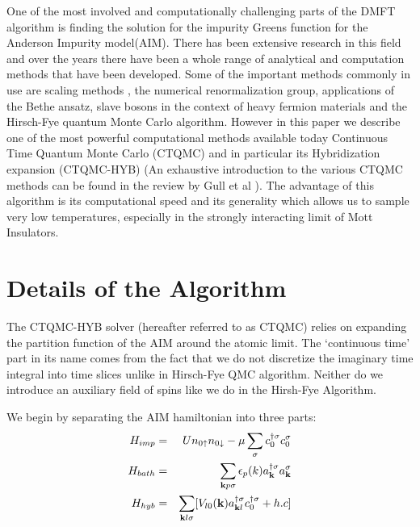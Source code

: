 \documentclass[10pt]{ruthesis}
\begin{document}
One of the most involved and computationally challenging parts of the DMFT algorithm is finding the solution for the impurity Greens function for the Anderson Impurity model(AIM). There has been extensive research in this field and over the years there have been a whole range of analytical and computation methods that have been developed. Some of the important  methods commonly in use are scaling methods \cite{AndersonKondo}, the numerical renormalization group\cite{wilson}, applications of the Bethe ansatz\cite{andrei}, slave bosons in the context of heavy fermion materials\cite{coleman} and the Hirsch-Fye quantum Monte Carlo algorithm\cite{hfye}. However in this paper we describe one of the most powerful computational methods available today Continuous Time Quantum Monte Carlo (CTQMC) and in particular its Hybridization expansion (CTQMC-HYB)\cite{wernerqmc} \cite{hauleqmc}(An exhaustive introduction to the various CTQMC methods can be found in the review by Gull et al \cite{millisqmc}). The  advantage of this algorithm is its computational speed and its generality which allows us to sample very low temperatures, especially in the strongly interacting limit of Mott Insulators.

\section{Details of the Algorithm}

The CTQMC-HYB solver (hereafter referred to as CTQMC) relies on expanding the partition function of the AIM around the atomic limit. The `continuous time' part in its name comes from the fact that we do not discretize the imaginary time integral into time slices unlike in Hirsch-Fye QMC algorithm. Neither do we introduce an  auxiliary field of spins like we do in the Hirsh-Fye Algorithm. 

We begin by separating the AIM hamiltonian into three parts:
\begin{eqnarray}
 H_{imp}&=&Un_{0\uparrow}n_{0\downarrow}-\mu\sum_{\sigma}c^{\dagger \sigma}_{0}c^{\sigma}_{0}\\
H_{bath}&=&\sum_{\mathbf{k} p\sigma} \epsilon_{p}(k)a^{\dagger\sigma}_{\mathbf{k}}a^{\sigma}_{\mathbf{k}}\\
H_{hyb}&=&\sum_{\mathbf{k} l\sigma}[V_{l0}(\mathbf{k})a^{\dagger\sigma}_{\mathbf{k} l}c^{\dagger\sigma}_{0} +h.c]
\end{eqnarray}
 
\end{document}
